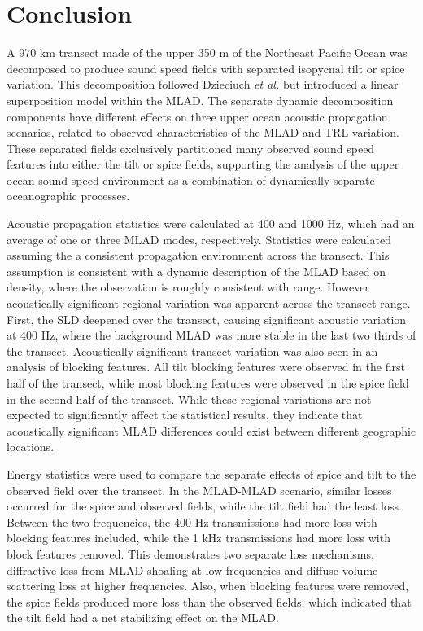 \documentclass[preprint,NumberedRefs]{JASA}
\begin{document}
\section{Conclusion}\label{sec:conclusion}
A 970 km transect made of the upper 350 m of the Northeast Pacific Ocean was decomposed to produce sound speed fields with separated isopycnal tilt or spice variation. This decomposition followed Dzieciuch \emph{et al.}\citep{dzieciuch2004} but introduced a linear superposition model within the MLAD. The separate dynamic decomposition components have different effects on three upper ocean acoustic propagation scenarios, related to observed characteristics of the MLAD and TRL variation. These separated fields exclusively partitioned many observed sound speed features into either the tilt or spice fields, supporting the analysis of the upper ocean sound speed environment as a combination of dynamically separate oceanographic processes.

Acoustic propagation statistics were calculated at 400 and 1000 Hz, which had an average of one or three MLAD modes, respectively. Statistics were calculated assuming the a consistent propagation environment across the transect. This assumption is consistent with a dynamic description of the MLAD based on density\citep{cole2010seasonal}, where the observation is roughly consistent with range. However acoustically significant regional variation was apparent across the transect range. First, the SLD deepened over the transect, causing significant acoustic variation at 400 Hz, where the background MLAD was more stable in the last two thirds of the transect.  Acoustically significant transect variation was also seen in an analysis of blocking features. All tilt blocking features were observed in the first half of the transect, while most blocking features were observed in the spice field in the second half of the transect. While these regional variations are not expected to significantly affect the statistical results, they indicate that acoustically significant MLAD differences could exist between different geographic locations.

Energy statistics were used to compare the separate effects of spice and tilt to the observed field over the transect. In the MLAD-MLAD scenario, similar losses occurred for the spice and observed fields, while the tilt field had the least loss. Between the two frequencies, the 400 Hz transmissions had more loss with blocking features included, while the 1 kHz transmissions had more loss with block features removed. This demonstrates two separate loss mechanisms, diffractive loss from MLAD shoaling at low frequencies and diffuse volume scattering loss at higher frequencies\cite{colosi2020observations}. Also, when blocking features were removed, the spice fields produced more loss than the observed fields, which indicated that the tilt field had a net stabilizing effect on the MLAD.
\end{document}

